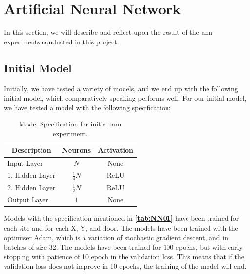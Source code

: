 \section{Artificial Neural Network} 
In this section, we will describe and reflect upon the result of the \gls{ann} experiments conducted in this project. 
 
\subsection{Initial Model}
Initially, we have tested a variety of models, and we end up with the following initial model, which comparatively speaking performs well.
For our initial model, we have tested a model with the following specification:

\begin{table}[H]
    \centering
    \caption{Model Specification for initial \gls{ann} experiment.}
    \begin{tabular}{m{}m{} m{}}
        \hline
        \multicolumn{1}{c}{\textbf{Description}} & \multicolumn{1}{c}{\textbf{Neurons}} & \multicolumn{1}{c}{\textbf{Activation}}\\
        \hline
        
        Input Layer         &   \multicolumn{1}{c}{$N$} & \multicolumn{1}{c}{None}        \\
        1. Hidden Layer     &   \multicolumn{1}{c}{$\frac{1}{4}N$}  & \multicolumn{1}{c}{ReLU}     \\
        2. Hidden Layer     &   \multicolumn{1}{c}{$\frac{1}{2}N$}  & \multicolumn{1}{c}{ReLU}     \\
        Output Layer     &   \multicolumn{1}{c}{$1$}  & \multicolumn{1}{c}{None}     \\
        \hline
    \end{tabular}
    \label{tab:NN01}
\end{table}

Models with the specification mentioned in \textbf{\autoref{tab:NN01}} have been trained for each site and for each X, Y, and floor. The models have been trained with the optimiser Adam, which is a variation of stochastic gradient descent, and in batches of size 32. The models have been trained for 100 epochs, but with early stopping with patience of 10 epoch in the validation loss. This means that if the validation loss does not improve in 10 epochs, the training of the model will end.

